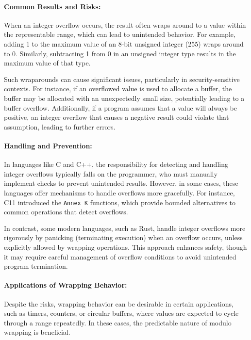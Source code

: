 \documentclass[12pt, oneside]{book}
\begin{document}
\paragraph{Common Results and Risks:}
When an integer overflow occurs, the result often wraps around to a value within the representable range, which can lead to unintended behavior. For example, adding 1 to the maximum value of an 8-bit unsigned integer (255) wraps around to 0. Similarly, subtracting 1 from 0 in an unsigned integer type results in the maximum value of that type.

Such wraparounds can cause significant issues, particularly in security-sensitive contexts. For instance, if an overflowed value is used to allocate a buffer, the buffer may be allocated with an unexpectedly small size, potentially leading to a buffer overflow. Additionally, if a program assumes that a value will always be positive, an integer overflow that causes a negative result could violate that assumption, leading to further errors.

\paragraph{Handling and Prevention:}
In languages like C and C++, the responsibility for detecting and handling integer overflows typically falls on the programmer, who must manually implement checks to prevent unintended results. However, in some cases, these languages offer mechanisms to handle overflows more gracefully. For instance, C11 introduced the \texttt{Annex K} functions, which provide bounded alternatives to common operations that detect overflows.

In contrast, some modern languages, such as Rust, handle integer overflows more rigorously by panicking (terminating execution) when an overflow occurs, unless explicitly allowed by wrapping operations. This approach enhances safety, though it may require careful management of overflow conditions to avoid unintended program termination.

\paragraph{Applications of Wrapping Behavior:}
Despite the risks, wrapping behavior can be desirable in certain applications, such as timers, counters, or circular buffers, where values are expected to cycle through a range repeatedly. In these cases, the predictable nature of modulo wrapping is beneficial.
\end{document}
